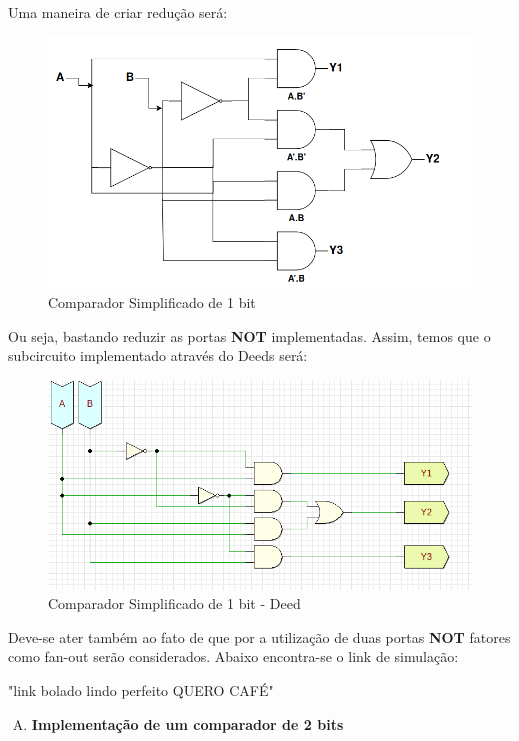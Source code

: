 \documentclass[12pt]{article}
\begin{document}
Uma maneira de criar redução será:
\begin{figure}[H]
    \centering
    \includegraphics[width=.9\textwidth]{Exp04/Comparador1Simplificado.png}
    \caption{Comparador Simplificado de 1 bit}\label{fig:Comparador1Bit.png}
\end{figure}

Ou seja, bastando reduzir as portas \textbf{NOT} implementadas. Assim, temos que o subcircuito implementado através do Deeds será:

\begin{figure}[H]
    \centering
    \includegraphics[width=.9\textwidth]{Exp04/Exp4.2.2.2.png}
    \caption{Comparador Simplificado de 1 bit - Deed}\label{fig:Comparador1Bit.png}
\end{figure}

Deve-se ater também ao fato de que por a utilização de duas portas \textbf{NOT} fatores como fan-out serão considerados.
Abaixo encontra-se o link de simulação:

"link bolado lindo perfeito QUERO CAFÉ"

\begin{enumerate}[C)]
\item \textbf{Implementação de um comparador de 2 bits}
\end{enumerate}
\end{document}
